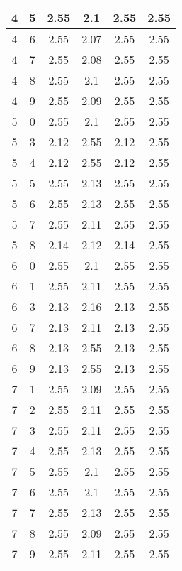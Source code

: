\begin{longtable}{|c|c||c||c||c|c|}
	4 & 5 & 2.55 & 2.1 & 2.55 & 2.55 \\ \hline
	4 & 6 & 2.55 & 2.07 & 2.55 & 2.55 \\ \hline
	4 & 7 & 2.55 & 2.08 & 2.55 & 2.55 \\ \hline
	4 & 8 & 2.55 & 2.1 & 2.55 & 2.55 \\ \hline
	4 & 9 & 2.55 & 2.09 & 2.55 & 2.55 \\ \hline
	5 & 0 & 2.55 & 2.1 & 2.55 & 2.55 \\ \hline
	5 & 3 & 2.12 & 2.55 & 2.12 & 2.55 \\ \hline
	5 & 4 & 2.12 & 2.55 & 2.12 & 2.55 \\ \hline
	5 & 5 & 2.55 & 2.13 & 2.55 & 2.55 \\ \hline
	5 & 6 & 2.55 & 2.13 & 2.55 & 2.55 \\ \hline
	5 & 7 & 2.55 & 2.11 & 2.55 & 2.55 \\ \hline
	5 & 8 & 2.14 & 2.12 & 2.14 & 2.55 \\ \hline
	6 & 0 & 2.55 & 2.1 & 2.55 & 2.55 \\ \hline
	6 & 1 & 2.55 & 2.11 & 2.55 & 2.55 \\ \hline
	6 & 3 & 2.13 & 2.16 & 2.13 & 2.55 \\ \hline
	6 & 7 & 2.13 & 2.11 & 2.13 & 2.55 \\ \hline
	6 & 8 & 2.13 & 2.55 & 2.13 & 2.55 \\ \hline
	6 & 9 & 2.13 & 2.55 & 2.13 & 2.55 \\ \hline
	7 & 1 & 2.55 & 2.09 & 2.55 & 2.55 \\ \hline
	7 & 2 & 2.55 & 2.11 & 2.55 & 2.55 \\ \hline
	7 & 3 & 2.55 & 2.11 & 2.55 & 2.55 \\ \hline
	7 & 4 & 2.55 & 2.13 & 2.55 & 2.55 \\ \hline
	7 & 5 & 2.55 & 2.1 & 2.55 & 2.55 \\ \hline
	7 & 6 & 2.55 & 2.1 & 2.55 & 2.55 \\ \hline
	7 & 7 & 2.55 & 2.13 & 2.55 & 2.55 \\ \hline
	7 & 8 & 2.55 & 2.09 & 2.55 & 2.55 \\ \hline
	7 & 9 & 2.55 & 2.11 & 2.55 & 2.55 \\ \hline
\end{longtable}
